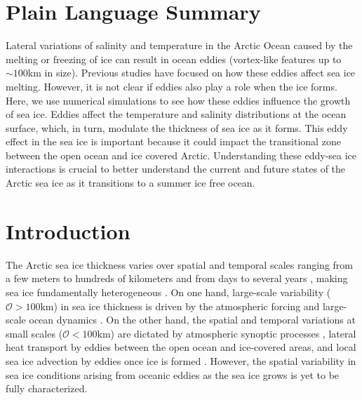 \documentclass[draft]{agujournal2019}
\begin{document}
\section*{Plain Language Summary}
\noindent Lateral variations of salinity and temperature in the Arctic Ocean caused by the melting or freezing of ice can result in ocean eddies (vortex-like features up to $\sim100$km in size). Previous studies have focused on how these eddies affect sea ice melting. However, it is not clear if eddies also play a role when the ice forms. Here, we use numerical simulations to see how these eddies influence the growth of sea ice. Eddies affect the temperature and salinity distributions at the ocean surface, which, in turn, modulate the thickness of sea ice as it forms. This eddy effect in the sea ice is important because it could impact the transitional zone between the open ocean and ice covered Arctic. Understanding these eddy-sea ice interactions is crucial to better understand the current and future states of the Arctic sea ice as it transitions to a summer ice free ocean.

\section{Introduction}\label{sec1}

The Arctic sea ice thickness varies over spatial and temporal scales ranging from a few meters to hundreds of kilometers and from days to several years \citep{Lewis_motion_1998, Mcnutt_spatial_2003}, making sea ice fundamentally heterogeneous \citep{Webster_ice_2022}. On one hand, large-scale variability ($\mathcal{O} > 100$km) in sea ice thickness is driven by the atmospheric forcing and large-scale ocean dynamics \citep{Mcnutt_spatial_2003,Morison_relaxation_2006,Halloran_drivers_2020}. 
On the other hand, the spatial and temporal variations at small scales ($\mathcal{O} < 100$km) are dictated by atmospheric synoptic processes \citep{Aue_cyclone_2022}, lateral heat transport by eddies between the open ocean and ice-covered areas, and local sea ice advection by eddies once ice is formed \citep{Cassianides_eddy_2021,Gupta_melt_2020,Horvat_ice_2018}. 
However, the spatial variability in sea ice conditions arising from oceanic eddies as the sea ice grows is yet to be fully characterized.
\end{document}
